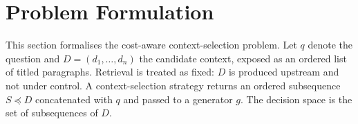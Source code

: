 \documentclass[runningheads]{llncs}
\begin{document}



\section{Problem Formulation}
\label{sec:problem}

This section formalises the cost-aware context-selection problem. Let $q$ denote the question and $D=(d_1,\dots,d_n)$ the candidate context, exposed as an ordered list of titled paragraphs. Retrieval is treated as fixed: $D$ is produced upstream and not under control. A context-selection strategy returns an ordered subsequence $S\preceq D$ concatenated with $q$ and passed to a generator $g$. The decision space is the set of subsequences of $D$.
\end{document}
